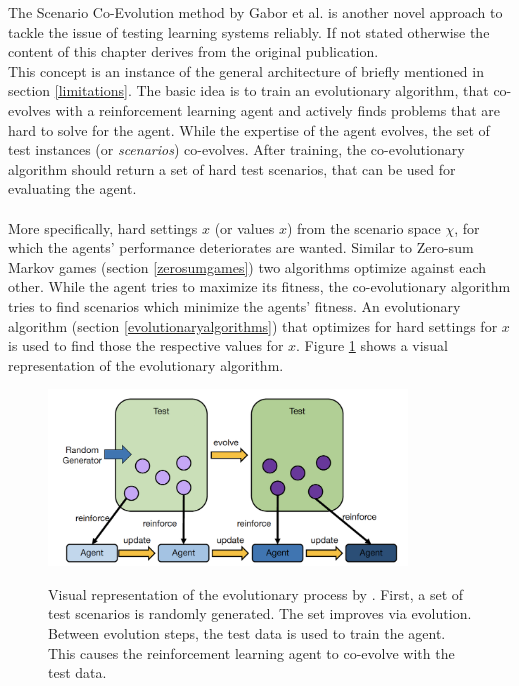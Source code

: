The Scenario Co-Evolution method by Gabor et al. \cite{gabor19} is another novel approach to tackle the issue of testing learning systems reliably. If not stated otherwise the content of this chapter derives from the original publication.\\
This concept is an instance of the general architecture of \cite{gabor18} briefly mentioned in section \ref{limitations}. The basic idea is to train an evolutionary algorithm, that co-evolves with a reinforcement learning agent and actively finds problems that are hard to solve for the agent. While the expertise of the agent evolves, the set of test instances (or \textit{scenarios}) co-evolves. After training, the co-evolutionary algorithm should return a set of hard test scenarios, that can be used for evaluating the agent.\\\\
More specifically, hard settings $x$ (or values $x$) from the scenario space $\chi$, for which the agents' performance deteriorates are wanted. Similar to Zero-sum Markov games (section \ref{zerosumgames}) two algorithms optimize against each other. While the agent tries to maximize its fitness, the co-evolutionary algorithm tries to find scenarios which minimize the agents' fitness. An evolutionary algorithm (section \ref{evolutionaryalgorithms}) that optimizes for hard settings for $x$ is used to find those the respective values for $x$. Figure \ref{fig:scenario_coevolution} shows a visual representation of the evolutionary algorithm.
\begin{figure}
  \centering
  \includegraphics[width=0.85\textwidth]{adversarial_learning/images/scenario_coevolution.png}
  \label{fig:scenario_coevolution}
  \caption{Visual representation of the evolutionary process by \cite{gabor19}. First, a set of test scenarios is randomly generated. The set improves via evolution. Between evolution steps, the test data is used to train the agent. This causes the reinforcement learning agent to co-evolve with the test data.}
\end{figure}

